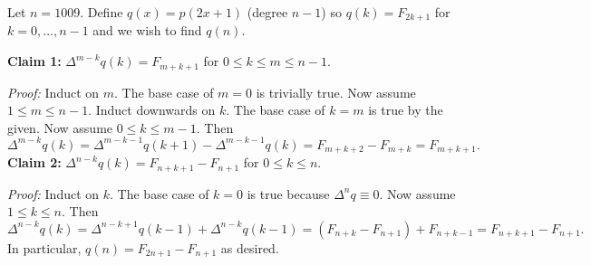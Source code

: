 Let $n=1009$. Define $q(x)=p(2x+1)$ (degree $n-1$) so $q(k)=F_{2k+1}$ for $k=0,\ldots,n-1$ and we wish to find $q(n)$.

\textbf{Claim 1:} $\Delta^{m-k}q(k)=F_{m+k+1}$ for $0\leq k\leq m\leq n-1$.

\textit{Proof:} Induct on $m$. The base case of $m=0$ is trivially true. Now assume $1\leq m\leq n-1$. Induct downwards on $k$. The base case of $k=m$ is true by the given. Now assume $0\leq k\leq m-1$. Then
\[
\Delta^{m-k}q(k)=\Delta^{m-k-1}q(k+1)-\Delta^{m-k-1}q(k)=F_{m+k+2}-F_{m+k}=F_{m+k+1}.
\]
\textbf{Claim 2:} $\Delta^{n-k}q(k)=F_{n+k+1}-F_{n+1}$ for $0\leq k\leq n$.

\textit{Proof:} Induct on $k$. The base case of $k=0$ is true because $\Delta^nq\equiv0$. Now assume $1\leq k\leq n$. Then
\[
\Delta^{n-k}q(k)=\Delta^{n-k+1}q(k-1)+\Delta^{n-k}q(k-1)=(F_{n+k}-F_{n+1})+F_{n+k-1}=F_{n+k+1}-F_{n+1}.
\]
In particular, $q(n)=F_{2n+1}-F_{n+1}$ as desired.